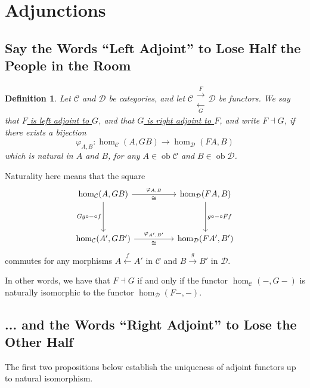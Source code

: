 \documentclass[a4paper,11pt]{article}
\theoremstyle{break_italics}
\newtheorem*{definition*}{Definition}
\theoremstyle{break_upright}
\theoremstyle{remark}
\newcommand{\ob}{\operatorname{ob}}
\newcommand{\C}{\mathcal{C}}
\newcommand{\D}{\mathcal{D}}
\begin{document}
\clearpage \newpage
\section{Adjunctions}

\subsection{Say the Words ``Left Adjoint'' to Lose Half the People in the Room}

\begin{definition*}
	Let $\C$ and $\D$ be categories, and let $\C \substack{\xrightarrow{F} \\ \xleftarrow[G]{}} \D$ be functors. We say that \uline{$F$ is left adjoint to $G$}, and that \uline{$G$ is right adjoint to $F$}, and write $F \dashv G$, if there exists a bijection
	\[
		\varphi_{A,B} \colon \hom_\C(A, GB) \to \hom_\D(FA, B)
	\]
	which is natural in $A$ and $B$, for any $A \in \ob\C$ and $B \in \ob\D$.
\end{definition*}

Naturality here means that the square
\[
\begin{tikzcd}
{\hom_\C(A, GB)} \arrow[rr, "{\varphi_{A,B}}", "\cong"'] \arrow[dd, "{Gg \circ - \circ f}"'] &  & {\hom_\D(FA, B)} \arrow[dd, "{g \circ - \circ Ff}"] \\
                                                                                                     &  &                                                                        \\
{\hom_\C(A', GB')} \arrow[rr, "{\varphi_{A',B'}}", "\cong"']                                                  &  & {\hom_\D(FA', B')}                                                    
\end{tikzcd}
\]
	commutes for any morphisms $A \xleftarrow{f} A'$ in $\C$ and $B \xrightarrow{g} B'$ in $\D$.

In other words, we have that $F \dashv G$ if and only if the functor $\hom_\C(-,G-)$ is naturally isomorphic to the functor $\hom_\D(F-, -)$.






\subsection{... and the Words ``Right Adjoint'' to Lose the Other Half}

The first two propositions below establish the uniqueness of adjoint functors up to natural isomorphism.
\end{document}

